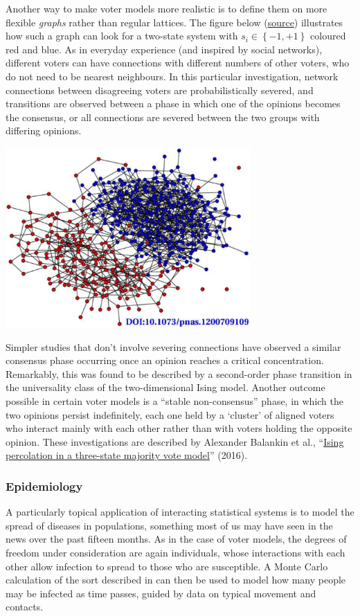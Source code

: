 Another way to make voter models more realistic is to define them on more flexible \textit{graphs} rather than regular lattices.
The figure below (\href{https://doi.org/10.1073/pnas.1200709109}{source}) illustrates how such a graph can look for a two-state system with $s_i \in \left\{-1, +1\right\}$ coloured red and blue.
As in everyday experience (and inspired by social networks), different voters can have connections with different numbers of other voters, who do not need to be nearest neighbours.
In this particular investigation, network connections between disagreeing voters are probabilistically severed, and transitions are observed between a phase in which one of the opinions becomes the consensus, or all connections are severed between the two groups with differing opinions.

\begin{center}\includegraphics[width=0.7\textwidth]{figs/unit10_voter.pdf}\end{center}

Simpler studies that don't involve severing connections have observed a similar consensus phase occurring once an opinion reaches a critical concentration.
Remarkably, this was found to be described by a second-order phase transition in the universality class of the two-dimensional Ising model.
Another outcome possible in certain voter models is a ``stable non-consensus'' phase, in which the two opinions persist indefinitely, each one held by a `cluster' of aligned voters who interact mainly with each other rather than with voters holding the opposite opinion.
These investigations are described by Alexander Balankin et al., ``\href{https://doi.org/10.1016/j.physleta.2016.12.001}{Ising percolation in a three-state majority vote model}'' (2016).

\subsubsection*{Epidemiology}
A particularly topical application of interacting statistical systems is to model the spread of diseases in populations, something most of us may have seen in the news over the past fifteen months.
As in the case of voter models, the degrees of freedom under consideration are again individuals, whose interactions with each other allow infection to spread to those who are susceptible.
A Monte Carlo calculation of the sort described in  can then be used to model how many people may be infected as time passes, guided by data on typical movement and contacts.

